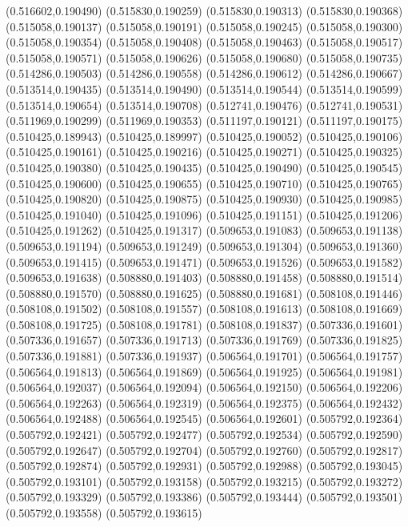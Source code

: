(0.516602,0.190490)
(0.515830,0.190259)
(0.515830,0.190313)
(0.515830,0.190368)
(0.515058,0.190137)
(0.515058,0.190191)
(0.515058,0.190245)
(0.515058,0.190300)
(0.515058,0.190354)
(0.515058,0.190408)
(0.515058,0.190463)
(0.515058,0.190517)
(0.515058,0.190571)
(0.515058,0.190626)
(0.515058,0.190680)
(0.515058,0.190735)
(0.514286,0.190503)
(0.514286,0.190558)
(0.514286,0.190612)
(0.514286,0.190667)
(0.513514,0.190435)
(0.513514,0.190490)
(0.513514,0.190544)
(0.513514,0.190599)
(0.513514,0.190654)
(0.513514,0.190708)
(0.512741,0.190476)
(0.512741,0.190531)
(0.511969,0.190299)
(0.511969,0.190353)
(0.511197,0.190121)
(0.511197,0.190175)
(0.510425,0.189943)
(0.510425,0.189997)
(0.510425,0.190052)
(0.510425,0.190106)
(0.510425,0.190161)
(0.510425,0.190216)
(0.510425,0.190271)
(0.510425,0.190325)
(0.510425,0.190380)
(0.510425,0.190435)
(0.510425,0.190490)
(0.510425,0.190545)
(0.510425,0.190600)
(0.510425,0.190655)
(0.510425,0.190710)
(0.510425,0.190765)
(0.510425,0.190820)
(0.510425,0.190875)
(0.510425,0.190930)
(0.510425,0.190985)
(0.510425,0.191040)
(0.510425,0.191096)
(0.510425,0.191151)
(0.510425,0.191206)
(0.510425,0.191262)
(0.510425,0.191317)
(0.509653,0.191083)
(0.509653,0.191138)
(0.509653,0.191194)
(0.509653,0.191249)
(0.509653,0.191304)
(0.509653,0.191360)
(0.509653,0.191415)
(0.509653,0.191471)
(0.509653,0.191526)
(0.509653,0.191582)
(0.509653,0.191638)
(0.508880,0.191403)
(0.508880,0.191458)
(0.508880,0.191514)
(0.508880,0.191570)
(0.508880,0.191625)
(0.508880,0.191681)
(0.508108,0.191446)
(0.508108,0.191502)
(0.508108,0.191557)
(0.508108,0.191613)
(0.508108,0.191669)
(0.508108,0.191725)
(0.508108,0.191781)
(0.508108,0.191837)
(0.507336,0.191601)
(0.507336,0.191657)
(0.507336,0.191713)
(0.507336,0.191769)
(0.507336,0.191825)
(0.507336,0.191881)
(0.507336,0.191937)
(0.506564,0.191701)
(0.506564,0.191757)
(0.506564,0.191813)
(0.506564,0.191869)
(0.506564,0.191925)
(0.506564,0.191981)
(0.506564,0.192037)
(0.506564,0.192094)
(0.506564,0.192150)
(0.506564,0.192206)
(0.506564,0.192263)
(0.506564,0.192319)
(0.506564,0.192375)
(0.506564,0.192432)
(0.506564,0.192488)
(0.506564,0.192545)
(0.506564,0.192601)
(0.505792,0.192364)
(0.505792,0.192421)
(0.505792,0.192477)
(0.505792,0.192534)
(0.505792,0.192590)
(0.505792,0.192647)
(0.505792,0.192704)
(0.505792,0.192760)
(0.505792,0.192817)
(0.505792,0.192874)
(0.505792,0.192931)
(0.505792,0.192988)
(0.505792,0.193045)
(0.505792,0.193101)
(0.505792,0.193158)
(0.505792,0.193215)
(0.505792,0.193272)
(0.505792,0.193329)
(0.505792,0.193386)
(0.505792,0.193444)
(0.505792,0.193501)
(0.505792,0.193558)
(0.505792,0.193615)
